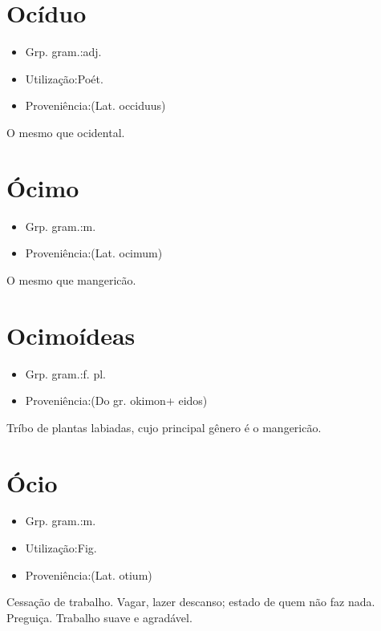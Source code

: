 \section{Ocíduo}
\begin{itemize}
\item {Grp. gram.:adj.}
\end{itemize}
\begin{itemize}
\item {Utilização:Poét.}
\end{itemize}
\begin{itemize}
\item {Proveniência:(Lat. \textunderscore occiduus\textunderscore )}
\end{itemize}
O mesmo que \textunderscore ocidental\textunderscore .
\section{Ócimo}
\begin{itemize}
\item {Grp. gram.:m.}
\end{itemize}
\begin{itemize}
\item {Proveniência:(Lat. \textunderscore ocimum\textunderscore )}
\end{itemize}
O mesmo que \textunderscore mangericão\textunderscore .
\section{Ocimoídeas}
\begin{itemize}
\item {Grp. gram.:f. pl.}
\end{itemize}
\begin{itemize}
\item {Proveniência:(Do gr. \textunderscore okimon\textunderscore  + \textunderscore eidos\textunderscore )}
\end{itemize}
Tríbo de plantas labiadas, cujo principal gênero é o mangericão.
\section{Ócio}
\begin{itemize}
\item {Grp. gram.:m.}
\end{itemize}
\begin{itemize}
\item {Utilização:Fig.}
\end{itemize}
\begin{itemize}
\item {Proveniência:(Lat. \textunderscore otium\textunderscore )}
\end{itemize}
Cessação de trabalho.
Vagar, lazer descanso; estado de quem não faz nada.
Preguiça.
Trabalho suave e agradável.
